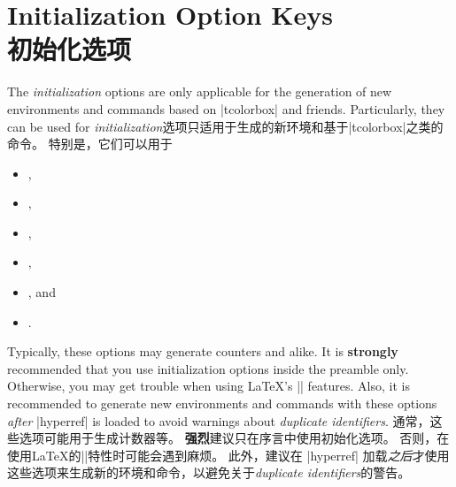 
\setcounter{section}{4}
\setcounter{subsection}{24}
\setcounter{subsubsection}{0}

% 
\section{Initialization Option Keys\\初始化选项}\label{sec:initkeys}%
%
\begin{stripedbox}
The \emph{initialization} options are only applicable for the generation
of new environments and commands based on |tcolorbox| and friends.
Particularly, they can be used for
\tcblower
\emph{initialization}选项只适用于生成的新环境和基于|tcolorbox|之类的命令。%
特别是，它们可以用于
\end{stripedbox}

\begin{itemize}
\item{},
\item{},
\item{},
\item{},
\item{}, and
\item{}.
\end{itemize}

\bigskip
\begin{marker}
\begin{stripedbox}[blank]
Typically, these options may generate counters and alike.
It is \textbf{strongly} recommended that you use initialization options inside the preamble only. 
Otherwise, you may get trouble when using \LaTeX's || features.
Also, it is recommended to generate new environments and commands with these
options \emph{after} |hyperref| is loaded to avoid warnings about \emph{duplicate identifiers}.
\tcblower
通常，这些选项可能用于生成计数器等。%
\textbf{强烈}建议只在序言中使用初始化选项。%
否则，在使用\LaTeX 的||特性时可能会遇到麻烦。
此外，建议在 |hyperref| 加载\emph{之后}才使用这些选项来生成新的环境和命令，以避免关于\emph{duplicate identifiers}的警告。
\end{stripedbox}
\end{marker}


